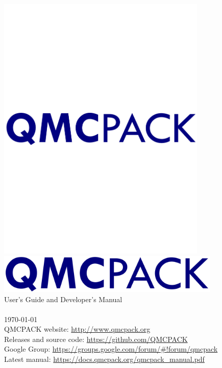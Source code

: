 
\begin{titlepage}
\vspace*{\fill}
\begin{center}

\ifpdf
\includegraphics[width=10cm]{./figures/QMCPACK_logo.pdf} \\
\else
\includegraphics[width=0.8\textwidth]{./figures/QMCPACK_logo.png} \\
\fi
{\huge User's Guide and Developer's Manual\\}
{\huge \QMCPACKver \\}
{\huge %
\today}\\
\vspace{2.5cm}
{\small QMCPACK website: \url{http://www.qmcpack.org}}\\
{\small Releases and source code:  \url{https://github.com/QMCPACK}}\\
{\small Google Group: \url{https://groups.google.com/forum/#!forum/qmcpack}}\\
{\small Latest manual: \url{https://docs.qmcpack.org/qmcpack_manual.pdf}}
\end{center}
\vspace*{\fill}
\end{titlepage}
